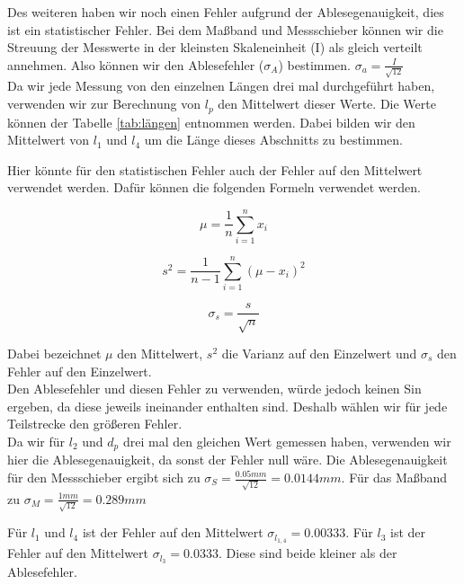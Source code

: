 \documentclass[twoside]{protokoll}
\begin{document}
Des weiteren haben wir noch einen Fehler aufgrund der Ablesegenauigkeit, dies ist ein statistischer Fehler.
Bei dem Maßband und Messschieber können wir die Streuung der Messwerte in der kleinsten Skaleneinheit (I) als gleich verteilt annehmen. 
Also können wir den Ablesefehler ($\sigma_A$) bestimmen. $\sigma_a = \frac{I}{\sqrt{12}}$\\

Da wir jede Messung von den einzelnen Längen drei mal durchgeführt haben, verwenden wir zur Berechnung von $l_p$ den Mittelwert dieser Werte. 
Die Werte können der Tabelle \ref{tab:längen} entnommen werden. 
Dabei bilden wir den Mittelwert von $l_1$ und $l_4$ um die Länge dieses Abschnitts zu bestimmen.

Hier könnte für den statistischen Fehler auch der Fehler auf den Mittelwert verwendet werden. 
Dafür können die folgenden Formeln verwendet werden. 

\begin{equation}
	\mu = \frac{1}{n}\sum_{i=1}^nx_i
\end{equation}

\begin{equation}
	s^2 = \frac{1}{n-1}\sum_{i=1}^n(\mu-x_i)^2
\end{equation}

\begin{equation}
	\sigma_s = \frac{s}{\sqrt{n}} 
\end{equation}

Dabei bezeichnet $\mu$ den Mittelwert, $s^2$ die Varianz auf den Einzelwert und $\sigma_s$ den Fehler auf den Einzelwert.\\

Den Ablesefehler und diesen Fehler zu verwenden, würde jedoch keinen Sin ergeben, da diese jeweils ineinander enthalten sind. 
Deshalb wählen wir für jede Teilstrecke den größeren Fehler. \\

Da wir für $l_2$ und $d_p$ drei mal den gleichen Wert gemessen haben, verwenden wir hier die Ablesegenauigkeit, da sonst der Fehler null wäre.
Die Ablesegenauigkeit für den Messschieber ergibt sich zu $\sigma_S = \frac{0.05mm}{\sqrt{12}} = 0.0144mm $. Für das Maßband zu $\sigma_M = \frac{1mm}{\sqrt{12}} = 0.289mm$

Für $l_1$ und $l_4$ ist der Fehler auf den Mittelwert $\sigma_{l_{1,4}} = 0.00333$.
Für $l_3$ ist der Fehler auf den Mittelwert $ \sigma_{l_3} = 0.0333$.
Diese sind beide kleiner als der Ablesefehler.\\
\end{document}
